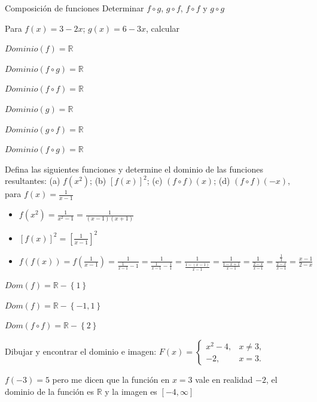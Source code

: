 \documentclass[aspectratio=169,10pt]{beamer}
\begin{document}
\begin{frame}{Composición de funciones}
Determinar $f\circ g$, $g\circ f$, $f\circ f$ y $g\circ g$

Para $f(x)=3-2x$; $g(x)=6-3x$, calcular

$Dominio(f)=\mathbb{R}$

$Dominio(f\circ g)=\mathbb{R}$

$Dominio(f\circ f)=\mathbb{R}$

$Dominio(g)=\mathbb{R}$

$Dominio(g\circ f)=\mathbb{R}$

$Dominio(f\circ g)=\mathbb{R}$

\end{frame}

\begin{frame}
Defina las siguientes funciones y determine el dominio de las funciones
resultantes: (a) $f(x^2)$; (b) $[f(x)]^2$; (c) $(f\circ f )(x)$; (d) $(f\circ f)(-x)$, para  $f(x) = \frac{1}{x-1}$

\begin{itemize}

\item $f(x^{2})=\frac{1}{x^2-1}=\frac{1}{(x-1)(x+1)}$

\item $[f(x)]^{2}=[\frac{1}{x-1}]^{2}$

\item $f(f(x))=f(\frac{1}{x-1})=\frac{1}{\frac{1}{x-1}-1}=\frac{1}{\frac{1}{x-1}-\frac{1}{1}}=\frac{1}{\frac{1-(x-1)}{x-1}}=\frac{1}{\frac{1-x+1}{x-1}}=\frac{1}{\frac{2-x}{x-1}}=\frac{\frac{1}{1}}{\frac{2-x}{x-1}}=\frac{x-1}{2-x}$
\end{itemize}

$Dom(f)=\mathbb{R}-\left\{1\right\}$

$Dom(f)=\mathbb{R}- \left\{-1,1\right\}$

$Dom(f\circ f)=\mathbb{R}-\left\{2\right\}$

\end{frame}

\begin{frame}
Dibujar y encontrar el dominio e imagen: $F(x)=\begin{cases}x^2-4,&x\neq3,\\-2,&x=3.\end{cases}$

$f(-3)=5$ pero me dicen que la funci\'on en $x=3$ vale en realidad $-2$, el dominio de la función es $\mathbb{R}$ y la imagen es $[-4,\infty]$

\end{frame}
\end{document}
